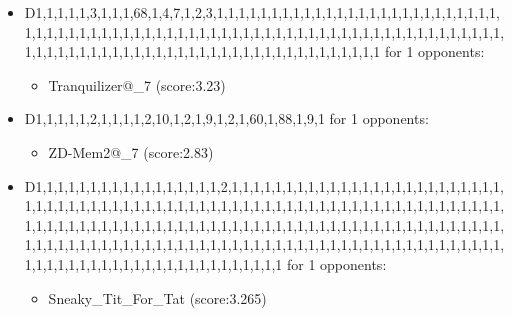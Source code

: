 \begin{appendices}
\begin{itemize}
        \item D1,1,1,1,1,3,1,1,1,68,1,4,7,1,2,3,1,1,1,1,1,1,1,1,1,1,1,1,1,1,1,1,1,1,1,1,1,1,1,1,1,1,1,1,1,1,1,1,1,1,1,1,1,1,1,1,1,1,1,1,1,1,1,1,1,1,1,1,1,1,1,1,1,1,1,1,1,1,1,1,1,1,1,1,1,1,1,1,1,1,1,1,1,1,1,1,1,1,1,1,1,1,1,1,1,1,1,1,1,1,1,1,1,1,1,1,1,1,1 for 1 opponents:
        \begin{multicols}{3}
            \begin{itemize}
                \item Tranquilizer@\_7 (score:3.23)
            \end{itemize}
        \end{multicols}

        \item D1,1,1,1,1,2,1,1,1,1,2,10,1,2,1,9,1,2,1,60,1,88,1,9,1 for 1 opponents:
        \begin{multicols}{3}
            \begin{itemize}
                \item ZD-Mem2@\_7 (score:2.83)
            \end{itemize}
        \end{multicols}

        \item D1,1,1,1,1,1,1,1,1,1,1,1,1,1,1,1,1,2,1,1,1,1,1,1,1,1,1,1,1,1,1,1,1,1,1,1,1,1,1,1,1,1,1,1,1,1,1,1,1,1,1,1,1,1,1,1,1,1,1,1,1,1,1,1,1,1,1,1,1,1,1,1,1,1,1,1,1,1,1,1,1,1,1,1,1,1,1,1,1,1,1,1,1,1,1,1,1,1,1,1,1,1,1,1,1,1,1,1,1,1,1,1,1,1,1,1,1,1,1,1,1,1,1,1,1,1,1,1,1,1,1,1,1,1,1,1,1,1,1,1,1,1,1,1,1,1,1,1,1,1,1,1,1,1,1,1,1,1,1,1,1,1,1,1,1,1,1,1,1,1,1,1,1,1,1,1,1,1,1,1,1,1,1,1,1,1,1,1,1,1,1,1,1,1,1,1,1,1,1 for 1 opponents:
        \begin{multicols}{3}
            \begin{itemize}
                \item Sneaky\_Tit\_For\_Tat (score:3.265)
            \end{itemize}
        \end{multicols}


\end{itemize}
\end{appendices}
